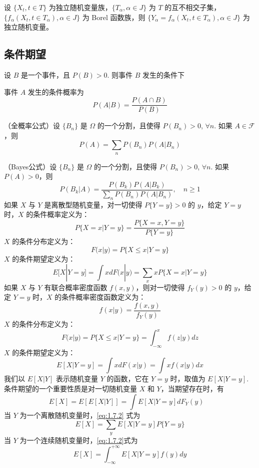 \documentclass[lang=cn,10pt,thmcnt=section]{elegantbook}
\begin{document}
\begin{theorem}
	设 $\{X_t, t \in T\}$ 为独立随机变量族，$\{T_\alpha, \alpha \in J\}$ 为 $T$ 的互不相交子集，$\{f_\alpha(X_t, t \in T_\alpha), \alpha \in J\}$ 为 Borel 函数族，则 $\{Y_\alpha = f_\alpha(X_t, t \in T_\alpha), \alpha \in J\}$ 为独立随机变量。

\end{theorem}

\subsection{条件期望}
设 $B$ 是一个事件，且 $P(B) > 0$. 则事件 $B$ 发生的条件下

事件 $A$ 发生的条件概率为
\[
P(A|B) = \frac{P(A \cap B)}{P(B)}
\]

（全概率公式）设 $\{B_n\}$ 是 $\Omega$ 的一个分割，且使得 $P(B_n) > 0$, $\forall n$. 如果 $A \in \mathcal{F}$，则
\[
P(A) = \sum_n P(B_n)P(A|B_n)
\]

（Bayes公式）设 $\{B_n\}$ 是 $\Omega$ 的一个分割，且使得 $P(B_n) > 0$, $\forall n$. 如果 $P(A) > 0$，则
\[
P(B_k|A) = \frac{P(B_k)P(A|B_k)}{\sum_n P(B_n)P(A|B_n)}, \quad n \geq 1
\]
如果 $X$ 与 $Y$ 是离散型随机变量，对一切使得 $P\{Y = y\} > 0$ 的 $y$，给定 $Y = y$ 时，$X$ 的条件概率定义为：
\[
P\{X = x|Y = y\} = \frac{P\{X = x, Y = y\}}{P\{Y = y\}}
\]
$X$ 的条件分布定义为：
\[
F(x|y) = P\{X \leq x|Y = y\}
\]
$X$ 的条件期望定义为：
\[
E[X|Y = y] = \int x dF(x|y) = \sum_x x P\{X = x|Y = y\}
\]
如果 $X$ 与 $Y$ 有联合概率密度函数 $f(x, y)$，则对一切使得 $f_Y(y) > 0$ 的 $y$，给定 $Y = y$ 时，$X$ 的条件概率密度函数定义为：
\[
f(x|y) = \frac{f(x, y)}{f_Y(y)}
\]
$X$ 的条件分布定义为：
\[
F(x|y) = P\{X \leq x|Y = y\} = \int_{-\infty}^{x} f(z|y) dz
\]
$X$ 的条件期望定义为：
\[
E[X|Y = y] = \int x dF(x|y) = \int x f(x|y) dx
\]
我们以 $E[X|Y]$ 表示随机变量 $Y$ 的函数，它在 $Y = y$ 时，取值为 $E[X|Y = y]$. 条件期望的一个重要性质是对一切随机变量 $X$ 和 $Y$，当期望存在时，有
\[
E[X] = E[E[X|Y]] = \int E[X|Y = y] dF_Y(y) \quad \tag{1.7.2}\label{eq:1.7.2}
\]
当 $Y$ 为一个离散随机变量时，\ref{eq:1.7.2} 式为
\[
E[X] = \sum_y E[X|Y = y] P\{Y = y\}
\]
当 $Y$ 为一个连续随机变量时，\ref{eq:1.7.2}式为
\[
E[X] = \int_{-\infty}^{+\infty} E[X|Y = y] f(y) dy
\]
\end{document}

